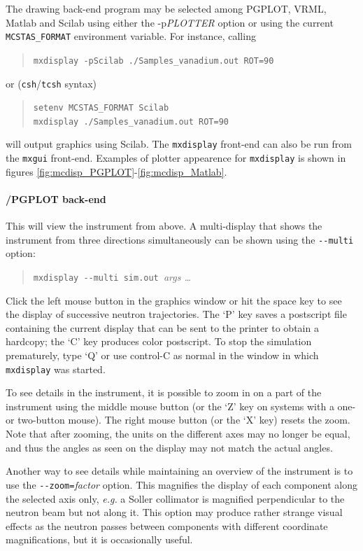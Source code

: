    
The drawing back-end program may be selected among PGPLOT, VRML, Matlab and Scilab using either the -p\textit{PLOTTER} option or using the current \verb+MCSTAS_FORMAT+ environment variable. 
For instance, calling
\begin{quote}
  \verb+mxdisplay -pScilab ./Samples_vanadium.out ROT=90+
\end{quote}
or (\verb+csh+/\verb+tcsh+ syntax)
\begin{quote}
  \verb+setenv MCSTAS_FORMAT Scilab+\\
  \verb+mxdisplay ./Samples_vanadium.out ROT=90+
\end{quote}
will output graphics using Scilab.
The \verb+mxdisplay+ front-end can also be run from the \verb+mxgui+ front-end.
Examples of plotter appearence for \verb+mxdisplay+ is shown in figures
 \ref{fig:mcdisp_PGPLOT}-\ref{fig:mcdisp_Matlab}.

\paragraph{\MCX /PGPLOT back-end}

This will view the instrument from above. A
multi-display that shows the instrument from three directions
simultaneously can be shown using the \verb+--multi+ option:
\begin{quote}
  \verb+mxdisplay --multi sim.out +\textit{args \ldots}
\end{quote}

Click the left mouse button in the graphics window or hit the space key
to see the display of successive neutron trajectories. The `P' key saves
a postscript file containing the current display that can be sent to the
printer to obtain a hardcopy; the `C' key produces color postscript.
To stop the simulation
prematurely, type `Q' or use control-C as normal in the window in which
\verb+mxdisplay+ was started.

To see details in the instrument, it is possible to zoom in on a part of
the instrument using the middle mouse button (or the `Z' key on systems
with a one- or two-button mouse). The right mouse button (or the `X'
key) resets the zoom. Note that after zooming, the units on the
different axes may no longer be equal, and thus the angles as seen on
the display may not match the actual angles.

Another way to see details while maintaining an overview of the
instrument is to use the \verb+--zoom=+\textit{factor} option. This
magnifies the display of each component along the selected axis only,
{\em e.g.} a Soller collimator is magnified perpendicular to the neutron beam
but not along it. This option may produce rather strange visual effects
as the neutron passes between components with different coordinate
magnifications, but it is occasionally useful.

